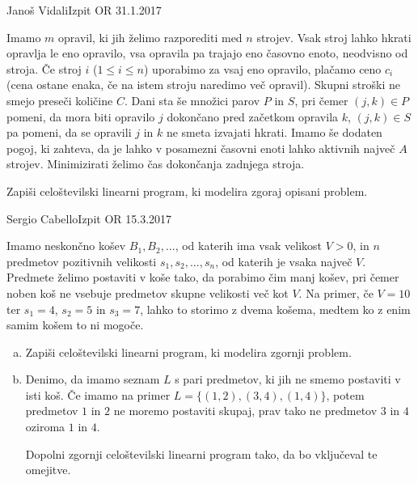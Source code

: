 \begin{naloga}{Janoš Vidali}{Izpit OR 31.1.2017}
\begin{vprasanje}
Imamo $m$ opravil, ki jih želimo razporediti med $n$ strojev.
Vsak stroj lahko hkrati opravlja le eno opravilo,
vsa opravila pa trajajo eno časovno enoto, neodvisno od stroja.
Če stroj $i$ ($1 \le i \le n$) uporabimo za vsaj eno opravilo,
plačamo ceno $c_i$
(cena ostane enaka, če na istem stroju naredimo več opravil).
Skupni stroški ne smejo preseči količine $C$.
Dani sta še množici parov $P$ in $S$,
pri čemer $(j, k) \in P$ pomeni,
da mora biti opravilo $j$ dokončano pred začetkom opravila $k$,
$(j, k) \in S$ pa pomeni, da se opravili $j$ in $k$ ne smeta izvajati hkrati.
Imamo še dodaten pogoj, ki zahteva,
da je lahko v posamezni časovni enoti lahko aktivnih največ $A$ strojev.
Minimizirati želimo čas dokončanja zadnjega stroja.

Zapiši celoštevilski linearni program, ki modelira zgoraj opisani problem.
\end{vprasanje}
\begin{odgovor}
\end{odgovor}
\end{naloga}


\begin{naloga}{Sergio Cabello}{Izpit OR 15.3.2017}
\begin{vprasanje}
Imamo neskončno košev $B_1, B_2, \dots$,
od katerih ima vsak velikost $V > 0$,
in $n$ predmetov pozitivnih velikosti $s_1, s_2, \dots, s_n$,
od katerih je vsaka največ $V$.
Predmete želimo postaviti v koše tako, da porabimo čim manj košev,
pri čemer noben koš ne vsebuje predmetov skupne velikosti več kot $V$.
Na primer, če $V = 10$ ter $s_1 = 4$, $s_2 = 5$ in $s_3 = 7$,
lahko to storimo z dvema košema, medtem ko z enim samim košem to ni mogoče.

\begin{enumerate}[(a)]
\item Zapiši celoštevilski linearni program, ki modelira zgornji problem.

\item Denimo, da imamo seznam $L$ s pari predmetov,
ki jih ne smemo postaviti v isti koš.
Če imamo na primer $L = \{(1, 2), (3, 4), (1, 4)\}$,
potem predmetov $1$ in $2$ ne moremo postaviti skupaj,
prav tako ne predmetov $3$ in $4$ oziroma $1$ in $4$.

Dopolni zgornji celoštevilski linearni program tako,
da bo vključeval te ome\-jit\-ve.
\end{enumerate}
\end{vprasanje}
\begin{odgovor}
\end{odgovor}
\end{naloga}


